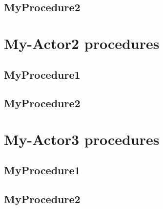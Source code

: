 \subsection{MyProcedure2}




\section{My-Actor2 procedures}
\subsection{MyProcedure1}
\subsection{MyProcedure2}


\section{My-Actor3 procedures}

\subsection{MyProcedure1}
\subsection{MyProcedure2}















